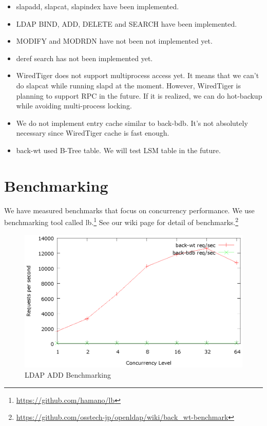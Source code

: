 \documentclass[a4paper
,twocolumn
]{article}
\begin{document}
\begin{itemize}
\itemsep1pt\parskip0pt
\item
  slapadd, slapcat, slapindex have been implemented.
\item
  LDAP BIND, ADD, DELETE and SEARCH have been implemented.
\item
  MODIFY and MODRDN have not been not implemented yet.
\item
  deref search has not been implemented yet.
\item
  WiredTiger does not support multiprocess access yet. It means that we
  can't do slapcat while running slapd at the moment. However,
  WiredTiger is planning to support RPC in the future. If it is
  realized, we can do hot-backup while avoiding multi-process locking.
\item
  We do not implement entry cache similar to back-bdb. It's not
  absolutely necessary since WiredTiger cache is fast enough.
\item
  back-wt used B-Tree table. We will test LSM table in the future.
\end{itemize}

\section{Benchmarking}\label{benchmarking}

We have measured benchmarks that focus on concurrency performance. We
use benchmarking tool called lb.\footnote{\url{https://github.com/hamano/lb}}
See our wiki page for detail of benchmarks.\footnote{\url{https://github.com/osstech-jp/openldap/wiki/back_wt-benchmark}}

\begin{figure}[H]
\centering
\includegraphics[width=0.9\columnwidth]{benchmark/add.eps}
\caption{LDAP ADD Benchmarking}
\end{figure}
\end{document}
